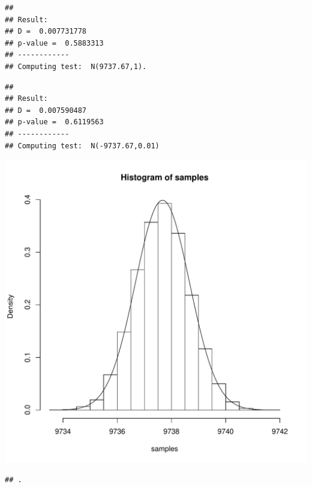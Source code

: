 \documentclass{llncs}\usepackage[]{graphicx}\usepackage[]{color}
\makeatletter
\def\maxwidth{ %
  \ifdim\Gin@nat@width>\linewidth
    \linewidth
  \else
    \Gin@nat@width
  \fi
}
\newenvironment{kframe}{%
 \def\at@end@of@kframe{}%
 \ifinner\ifhmode%
  \def\at@end@of@kframe{\end{minipage}}%
  \begin{minipage}{\columnwidth}%
 \fi\fi%
 \def\FrameCommand##1{\hskip\@totalleftmargin \hskip-\fboxsep
 \colorbox{shadecolor}{##1}\hskip-\fboxsep
     \hskip-\linewidth \hskip-\@totalleftmargin \hskip\columnwidth}%
 \MakeFramed {\advance\hsize-\width
   \@totalleftmargin\z@ \linewidth\hsize
   \@setminipage}}%
 {\par\unskip\endMakeFramed%
 \at@end@of@kframe}
\newenvironment{knitrout}{}{} %
\makeatother
\begin{document}
\begin{knitrout}
\begin{kframe}\begin{lstlisting}[basicstyle=\ttfamily,breaklines=true]
## 
## Result:
## D =  0.007731778 
## p-value =  0.5883313 
## ------------
## Computing test:  N(9737.67,1).
\end{lstlisting}
\begin{lstlisting}[basicstyle=\ttfamily,breaklines=true]
## 
## Result:
## D =  0.007590487 
## p-value =  0.6119563 
## ------------
## Computing test:  N(-9737.67,0.01)
\end{lstlisting}


{\ttfamily\noindent\color{warningcolor}{\#\# Warning in ks.test(samples, true\_cdf, ...): ties should not be present for the Kolmogorov-Smirnov test}}\end{kframe}
\includegraphics[width=\maxwidth]{figure/Rt-21} 
\begin{kframe}\begin{lstlisting}[basicstyle=\ttfamily,breaklines=true]
## .
\end{lstlisting}
\end{kframe}

\end{knitrout}
\end{document}

